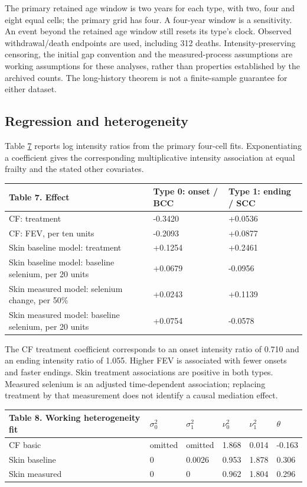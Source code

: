 \documentclass[11pt]{article}
\begin{document}
The primary retained age window is two years for each type, with two, four and eight equal cells; the primary grid has four. A four-year window is a sensitivity. An event beyond the retained age window still resets its type's clock. Observed withdrawal/death endpoints are used, including 312 deaths. Intensity-preserving censoring, the initial gap convention and the measured-process assumptions are working assumptions for these analyses, rather than properties established by the archived counts. The long-history theorem is not a finite-sample guarantee for either dataset.

\subsection{Regression and heterogeneity}\label{sec:7.2}

Table \hyperref[tab:7]{7} reports log intensity ratios from the primary four-cell fits. Exponentiating a coefficient gives the corresponding multiplicative intensity association at equal frailty and the stated other covariates.

\label{tab:7}
{\scriptsize
\begin{longtable}{lll}
\toprule
\textbf{Table 7. Effect} & \textbf{Type 0: onset / BCC} & \textbf{Type 1: ending / SCC} \\
\midrule
\endhead
\bottomrule
\endlastfoot
CF: treatment & -0.3420 & +0.0536 \\
CF: FEV, per ten units & -0.2093 & +0.0877 \\
Skin baseline model: treatment & +0.1254 & +0.2461 \\
Skin baseline model: baseline selenium, per 20 units & +0.0679 & -0.0956 \\
Skin measured model: selenium change, per 50\% & +0.0243 & +0.1139 \\
Skin measured model: baseline selenium, per 20 units & +0.0754 & -0.0578 \\
\end{longtable}}

The CF treatment coefficient corresponds to an onset intensity ratio of 0.710 and an ending intensity ratio of 1.055. Higher FEV is associated with fewer onsets and faster endings. Skin treatment associations are positive in both types. Measured selenium is an adjusted time-dependent association; replacing treatment by that measurement does not identify a causal mediation effect.

\label{tab:8}
{\setlength{\tabcolsep}{4pt}
\begin{longtable}{llllll}
\toprule
\textbf{Table 8. Working heterogeneity fit} & \textbf{\(\sigma_0^2\)} & \textbf{\(\sigma_1^2\)} & \textbf{\(\nu_0^2\)} & \textbf{\(\nu_1^2\)} & \textbf{\(\theta\)} \\
\midrule
\endhead
\bottomrule
\endlastfoot
CF basic & omitted & omitted & 1.868 & 0.014 & -0.163 \\
Skin baseline & 0 & 0.0026 & 0.953 & 1.878 & 0.306 \\
Skin measured & 0 & 0 & 0.962 & 1.804 & 0.296 \\
\end{longtable}}
\end{document}
